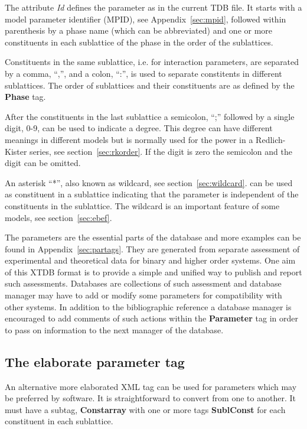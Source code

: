 \documentclass{article}
\begin{document}
The attribute {\em Id} defines the parameter as in the current TDB
file.  It starts with a model parameter identifier (MPID), see
Appendix~\ref{sec:mpid}, followed within parenthesis by a phase name
(which can be abbreviated) and one or more constituents in each
sublattice of the phase in the order of the sublattices.

Constituents in the same sublattice, i.e.  for interaction parameters,
are separated by a comma, ``,'', and a colon, ``:'', is used to
separate constitents in different sublattices.  The order of
sublattices and their constituents are as defined by the {\bf Phase}
tag.

After the constituents in the last sublattice a semicolon, ``;''
followed by a single digit, 0-9, can be used to indicate a degree.
This degree can have different meanings in different models but is
normally used for the power in a Redlich-Kister series, see
section~\ref{sec:rkorder}.  If the digit is zero the semicolon and the
digit can be omitted.

An asterisk ``*'', also known as wildcard, see
section~\ref{sec:wildcard}. can be used as constituent in a sublattice
indicating that the parameter is independent of the constituents in
the sublattice.  The wildcard is an important feature of some models,
see section~\ref{sec:ebef}.

The parameters are the essential parts of the database and more
examples can be found in Appendix~\ref{sec:partags}.  They are
generated from separate assessment of experimental and theoretical
data for binary and higher order systems.  One aim of this XTDB format
is to provide a simple and unified way to publish and report such
assessments.  Databases are collections of such assessment and
database manager may have to add or modify some parameters for
compatibility with other systems.  In addition to the bibliographic
reference a database manager is encouraged to add comments of such
actions within the {\bf Parameter} tag in order to pass on information
to the next manager of the database.

\subsection{The elaborate parameter tag}\label{sec:parameter2}

An alternative more elaborated XML tag can be used for parameters
which may be preferred by software.  It is straightforward to convert
from one to another.  It must have a subtag, {\bf Constarray} with one
or more tags {\bf SublConst} for each constituent in each sublattice.
\end{document}
